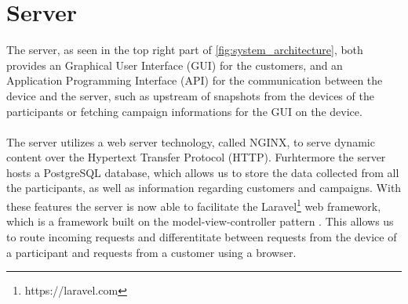 \section{Server}
\label{sec:server}
The server, as seen in the top right part of \ref{fig:system_architecture}, both provides an Graphical User Interface (GUI) for the customers, and an Application Programming Interface (API) for the communication between the device and the server, such as upstream of snapshots from the devices of the participants or fetching campaign informations for the GUI on the device. 
\\\\
The server utilizes a web server technology, called NGINX, to serve dynamic content over the Hypertext Transfer Protocol (HTTP). Furhtermore the server hosts a PostgreSQL database, which allows us to store the data collected from all the participants, as well as information regarding customers and campaigns.  
With these features the server is now able to facilitate the Laravel\footnote{https://laravel.com} web framework, which is a framework built on the model-view-controller pattern \parencite{leff2001web}. This allows us to route incoming requests and differentitate between requests from the device of a participant and requests from a customer using a browser. 





